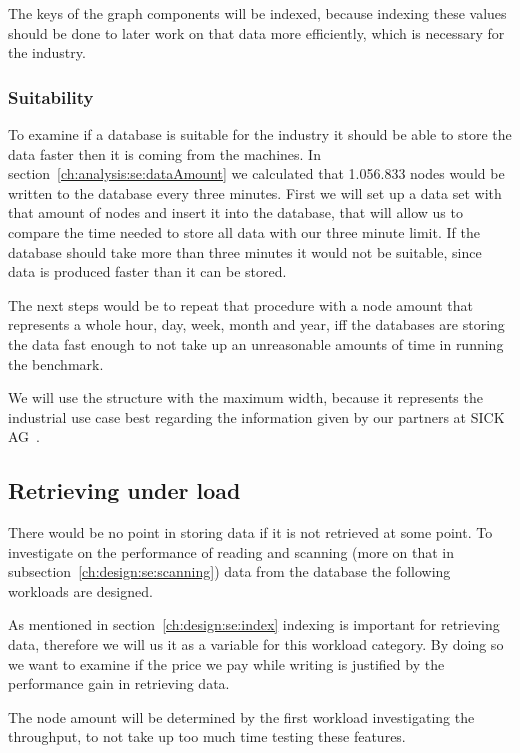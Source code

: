 The keys of the graph components will be indexed,
because indexing these values should be done to later work on that data more efficiently,
which is necessary for the industry.

\subsubsection{Suitability}
To examine if a database is suitable for the industry it should be able to store the data faster then it is coming from the machines.
In section~\ref{ch:analysis:se:dataAmount} we calculated that 1.056.833 nodes would be written to the database every three minutes.
First we will set up a data set with that amount of nodes and insert it into the database,
that will allow us to compare the time needed to store all data with our three minute limit.
If the database should take more than three minutes it would not be suitable,
since data is produced faster than it can be stored.

The next steps would be to repeat that procedure with a node amount that represents a whole hour, day, week, month and year,
iff the databases are storing the data fast enough to not take up an unreasonable amounts of time in running the benchmark.

We will use the structure with the maximum width,
because it represents the industrial use case best regarding the information given by our partners at SICK AG~\cite{SICK}.

\subsection{Retrieving under load}
\label{ch:design:se:retrievingUnderLoad}
There would be no point in storing data if it is not retrieved at some point.
To investigate on the performance of reading and scanning (more on that in subsection~\ref{ch:design:se:scanning}) data from the database the following workloads are designed.

As mentioned in section~\ref{ch:design:se:index} indexing is important for retrieving data,
therefore we will us it as a variable for this workload category.
By doing so we want to examine if the price we pay while writing is justified by the performance gain in retrieving data.

The node amount will be determined by the first workload investigating the throughput,
to not take up too much time testing these features.

